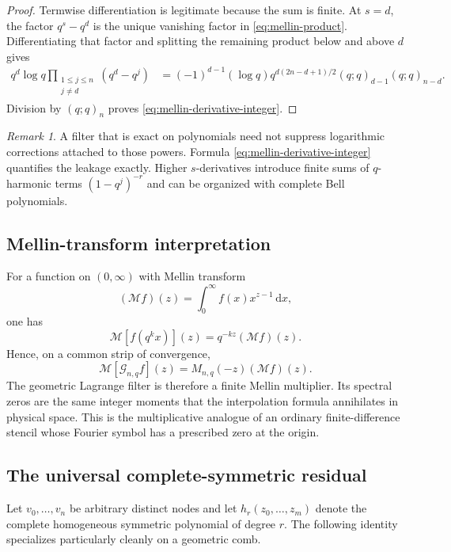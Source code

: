 \documentclass[11pt,a4paper,oneside]{article}
\theoremstyle{definition}
\theoremstyle{remark}
\newtheorem{remark}[remark]{Remark}
\newcommand{\dd}{\,\mathrm d}
\newcommand{\Mellin}{\mathcal M}
\newcommand{\Gop}{\mathcal G}
\begin{document}
\begin{proof}
Termwise differentiation is legitimate because the sum is finite.  At
$s=d$, the factor $q^s-q^d$ is the unique vanishing factor in
\eqref{eq:mellin-product}.  Differentiating that factor and splitting the
remaining product below and above $d$ gives
\begin{align*}
 q^d\log q\prod_{\substack{1\le j\le n\\j\ne d}}(q^d-q^j)
 &=(-1)^{d-1}(\log q)
 q^{d(2n-d+1)/2}(q;q)_{d-1}(q;q)_{n-d}.
\end{align*}
Division by $(q;q)_n$ proves \eqref{eq:mellin-derivative-integer}.
\end{proof}

\begin{remark}
A filter that is exact on polynomials need not suppress logarithmic
corrections attached to those powers.  Formula
\eqref{eq:mellin-derivative-integer} quantifies the leakage exactly.  Higher
$s$-derivatives introduce finite sums of $q$-harmonic terms
$(1-q^j)^{-r}$ and can be organized with complete Bell polynomials.
\end{remark}

\subsection{Mellin-transform interpretation}

For a function on $(0,\infty)$ with Mellin transform
\[
 (\Mellin f)(z)=\int_0^\infty f(x)x^{z-1}\dd x,
\]
one has
\[
 \Mellin[f(q^kx)](z)=q^{-kz}(\Mellin f)(z).
\]
Hence, on a common strip of convergence,
\begin{equation}
 \Mellin[\Gop_{n,q}f](z)=M_{n,q}(-z)(\Mellin f)(z).
 \label{eq:mellin-transform-multiplier}
\end{equation}
The geometric Lagrange filter is therefore a finite Mellin multiplier.  Its
spectral zeros are the same integer moments that the interpolation formula
annihilates in physical space.  This is the multiplicative analogue of an
ordinary finite-difference stencil whose Fourier symbol has a prescribed zero
at the origin.

\subsection{The universal complete-symmetric residual}

Let $v_0,\ldots,v_n$ be arbitrary distinct nodes and let
$h_r(z_0,\ldots,z_m)$ denote the complete homogeneous symmetric polynomial of
degree $r$.  The following identity specializes particularly cleanly on a
geometric comb.
\end{document}
